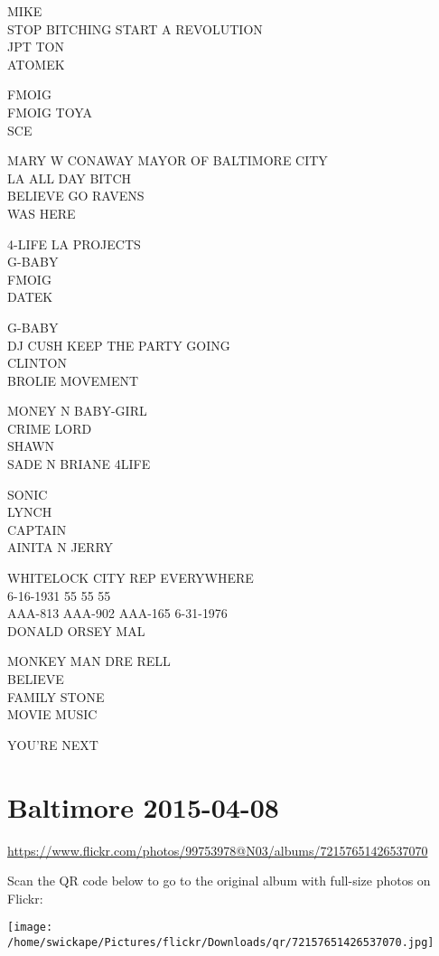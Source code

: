\documentclass[10pt,letterpaper]{article}
\begin{document}
MIKE\\
STOP BITCHING START A REVOLUTION\\
JPT TON\\
ATOMEK

FMOIG\\
FMOIG TOYA\\
SCE

MARY W CONAWAY MAYOR OF BALTIMORE CITY\\
LA ALL DAY BITCH\\
BELIEVE GO RAVENS\\
WAS HERE

4{-}LIFE LA PROJECTS\\
G{-}BABY\\
FMOIG\\
DATEK

G{-}BABY\\
DJ CUSH KEEP THE PARTY GOING\\
CLINTON\\
BROLIE MOVEMENT

MONEY N BABY{-}GIRL\\
CRIME LORD\\
SHAWN\\
SADE N BRIANE 4LIFE

SONIC\\
LYNCH\\
CAPTAIN\\
AINITA N JERRY

WHITELOCK CITY REP EVERYWHERE\\
6{-}16{-}1931 55 55 55\\
AAA{-}813 AAA{-}902 AAA{-}165 6{-}31{-}1976\\
DONALD ORSEY MAL

MONKEY MAN DRE RELL\\
BELIEVE\\
FAMILY STONE\\
MOVIE MUSIC

YOU'RE NEXT


\section*{Baltimore 2015-04-08}

\url{https://www.flickr.com/photos/99753978@N03/albums/72157651426537070}

Scan the QR code below to go to the original album with full-size photos on Flickr:

\texttt{[image: /home/swickape/Pictures/flickr/Downloads/qr/72157651426537070.jpg]}
\end{document}
